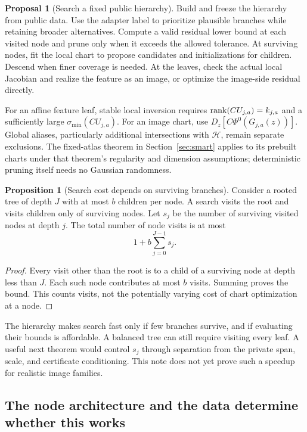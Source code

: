 \documentclass[11pt,a4paper]{article}
\theoremstyle{definition}
\newtheorem{proposition}[theorem]{Proposition}
\theoremstyle{definition}
\newtheorem{proposal}[theorem]{Proposal}
\theoremstyle{remark}\newtheorem{remark}[theorem]{Remark}
\newcommand{\HH}{\mathcal H}\newcommand{\XX}{\mathcal X}\newcommand{\col}{\operatorname{col}}
\newcommand{\smin}{\sigma_{\min}}\newcommand{\smax}{\sigma_{\max}}
\begin{document}
\begin{proposal}[Search a fixed public hierarchy]\label{pr:treesearch}
Build and freeze the hierarchy from public data. Use the adapter label to prioritize plausible branches while retaining broader alternatives. Compute a valid residual lower bound at each visited node and prune only when it exceeds the allowed tolerance. At surviving nodes, fit the local chart to propose candidates and initializations for children. Descend when finer coverage is needed. At the leaves, check the actual local Jacobian and realize the feature as an image, or optimize the image-side residual directly.

For an affine feature leaf, stable local inversion requires $\operatorname{rank}(CU_{j,a})=k_{j,a}$ and a sufficiently large $\smin(CU_{j,a})$. For an image chart, use $D_z[C\Phi^0(G_{j,a}(z))]$. Global aliases, particularly additional intersections with $\HH$, remain separate exclusions. The fixed-atlas theorem in Section~\ref{sec:smart} applies to its prebuilt charts under that theorem's regularity and dimension assumptions; deterministic pruning itself needs no Gaussian randomness.
\end{proposal}

\begin{proposition}[Search cost depends on surviving branches]\label{prop:treesurvivors}
Consider a rooted tree of depth $J$ with at most $b$ children per node. A search visits the root and visits children only of surviving nodes. Let $s_j$ be the number of surviving visited nodes at depth $j$. The total number of node visits is at most
\[
1+b\sum_{j=0}^{J-1}s_j.
\]
\end{proposition}
\begin{proof}
Every visit other than the root is to a child of a surviving node at depth less than $J$. Each such node contributes at most $b$ visits. Summing proves the bound. This counts visits, not the potentially varying cost of chart optimization at a node.
\end{proof}

The hierarchy makes search fast only if few branches survive, and if evaluating their bounds is affordable. A balanced tree can still require visiting every leaf. A useful next theorem would control $s_j$ through separation from the private span, scale, and certificate conditioning. This note does not yet prove such a speedup for realistic image families.

\subsection{The node architecture and the data determine whether this works}
\end{document}
